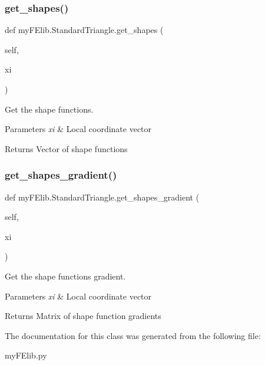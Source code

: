 \subsubsection{\texorpdfstring{get\+\_\+shapes()}{get\_shapes()}}
{\footnotesize\ttfamily def my\+F\+Elib.\+Standard\+Triangle.\+get\+\_\+shapes (\begin{DoxyParamCaption}\item[{}]{self,  }\item[{}]{xi }\end{DoxyParamCaption})}



Get the shape functions. 


\begin{DoxyParams}{Parameters}
{\em xi} & Local coordinate vector \\
\hline
\end{DoxyParams}
\begin{DoxyReturn}{Returns}
Vector of shape functions 
\end{DoxyReturn}
\mbox{\label{classmyFElib_1_1StandardTriangle_abb8220126b3749be519c838a2a8a55e8}} 
\subsubsection{\texorpdfstring{get\+\_\+shapes\+\_\+gradient()}{get\_shapes\_gradient()}}
{\footnotesize\ttfamily def my\+F\+Elib.\+Standard\+Triangle.\+get\+\_\+shapes\+\_\+gradient (\begin{DoxyParamCaption}\item[{}]{self,  }\item[{}]{xi }\end{DoxyParamCaption})}



Get the shape functions gradient. 


\begin{DoxyParams}{Parameters}
{\em xi} & Local coordinate vector \\
\hline
\end{DoxyParams}
\begin{DoxyReturn}{Returns}
Matrix of shape function gradients 
\end{DoxyReturn}


The documentation for this class was generated from the following file\+:\begin{DoxyCompactItemize}
\item 
my\+F\+Elib.\+py\end{DoxyCompactItemize}
